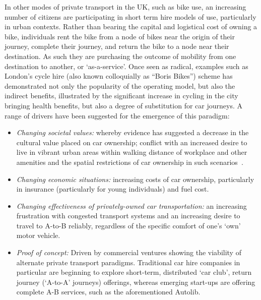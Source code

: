 \documentclass[journal]{IEEEtran}
\begin{document}
In other modes of private transport in the UK, such as bike use, an
increasing number of citizens are participating in short term hire
models of use, particularly in urban contexts. Rather than bearing the
capital and logistical cost of owning a bike, individuals rent the
bike from a node of bikes near the origin of their journey, complete
their journey, and return the bike to a node near their
destination. As such they are purchasing the outcome of mobility from
one destination to another, or `as-a-service'. Once seen as radical,
examples such as London’s cycle hire (also known colloquially as
``Boris Bikes'') scheme has demonstrated not only the popularity of
the operating model, but also the indirect benefits, illustrated by
the significant increase in cycling in the city bringing health
benefits, but also a degree of substitution for car journeys. A range
of drivers have been suggested for the emergence of this paradigm:

\begin{itemize}
\item {\emph{Changing societal values:}} whereby evidence has
suggested a decrease in the cultural value placed on car ownership;
conflict with an increased desire to live in vibrant urban areas
within walking distance of workplace and other amenities and the
spatial restrictions of car ownership in such
scenarios~\cite{jenks+burgess:2011}.
\item {\emph{Changing economic situations:}} increasing costs of car
ownership, particularly in insurance (particularly for young
individuals) and fuel cost.
\item {\emph{Changing effectiveness of privately-owned car
transportation:}} an increasing frustration with congested transport
systems and an increasing desire to travel to A-to-B reliably,
regardless of the specific comfort of one's `own' motor vehicle.
\item {\emph{Proof of concept:}} Driven by commercial ventures showing
the viability of alternate private transport paradigms. Traditional
car hire companies in particular are beginning to explore short-term,
distributed `car club', return journey (`A-to-A' journeys) offerings,
whereas emerging start-ups are offering complete A-B services, such as
the aforementioned Autolib.
\end{itemize}

\end{document}
